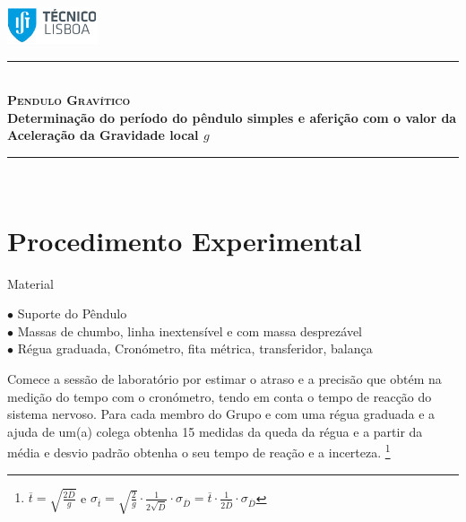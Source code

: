 \documentclass[a4paper,12pt]{article}      %
\author{Prof. Bernardo B. Carvalho}
\date{ Setembro 2017}
\newcommand{\HRule}{\rule{\linewidth}{0.5mm}}
\begin{document}
 


\includegraphics[width=0.2\textwidth]{../../logo-ist}%
	
	\HRule \\[0.5cm]
	{ \huge   \bfseries \textsc{ Pendulo Gravítico } }\\[0.4cm]
	{ \large \bfseries Determinação do período do pêndulo simples e aferição com o valor da Aceleração da Gravidade local $g$  }\\
	\HRule \\%
	

\section*{\sf Procedimento Experimental}
{ \large Material }
 \begin{flushleft}
	 $\bullet$ Suporte do Pêndulo \\
	 $\bullet$ Massas de chumbo, linha inextensível e com massa desprezável \\
	 $\bullet$ Régua graduada, Cronómetro, fita métrica, transferidor, balança
\end{flushleft} 

Comece a sessão de laboratório por estimar o atraso e a precisão que obtém na medição do tempo com o cronómetro, tendo em conta 
o tempo de reacção do sistema nervoso. 
Para cada membro do Grupo e com  uma régua graduada e a ajuda de um(a) colega obtenha 15 medidas da queda da régua e a partir da média e desvio padrão obtenha o seu tempo de reação  e a incerteza.
\footnote{$\overline{t}=\sqrt{\frac{2 \overline{D}}{g}}$ e   
$\sigma_{\overline{t}}=\sqrt{\frac{2 }{g}} \cdot \frac{1}{2\sqrt{\overline{D}}} \cdot \sigma_{\overline{D}}  
= \overline{t} \cdot \frac{1}{2\overline{D}} \cdot \sigma_{\overline{D}} $ }
\end{document}
